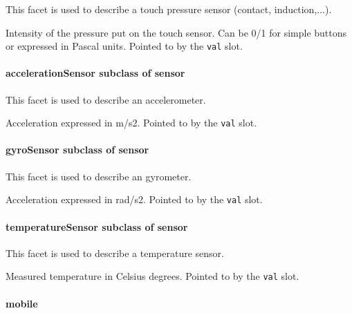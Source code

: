 This facet is used to describe a touch pressure sensor (contact,
induction,...).

\begin{slots}
  {%
    Intensity of the pressure put on the touch sensor. Can be 0/1 for
    simple buttons or expressed in Pascal units. Pointed to by the
    \texttt{val} slot.%
  }

\end{slots}


\paragraph{ accelerationSensor  \textmd{subclass of sensor}}

This facet is used to describe an accelerometer.

\begin{slots}
  {%
    Acceleration expressed in m/s2.  Pointed to by the \texttt{val}
    slot.%
  }

\end{slots}

\paragraph{gyroSensor  \textmd{subclass of sensor}}

This facet is used to describe an gyrometer.

\begin{slots}
  {%
    Acceleration expressed in rad/s2.  Pointed to by the \texttt{val}
    slot.%
  }

\end{slots}

\paragraph{ temperatureSensor  \textmd{subclass of sensor}}


This facet is used to describe a temperature sensor.

\begin{slots}
  {%
    Measured temperature in Celsius degrees.  Pointed to by the
    \texttt{val} slot.%
  }

\end{slots}

\paragraph{mobile}

